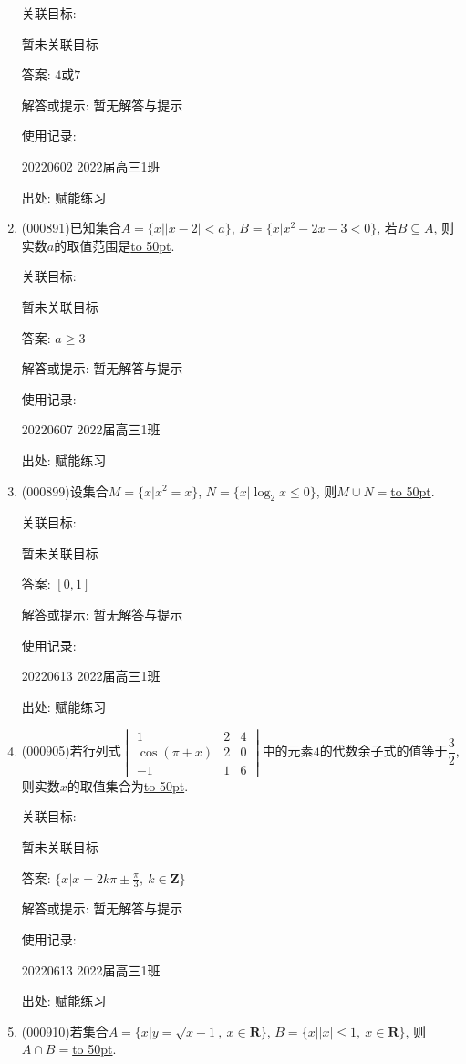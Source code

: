 \documentclass[10pt,a4paper]{article}
\newcommand{\blank}[1]{\underline{\hbox to #1pt{}}}
\begin{document}
\begin{enumerate}[1.]
关联目标:

暂未关联目标

答案: $4$或$7$

解答或提示: 暂无解答与提示

使用记录:

20220602	2022届高三1班	


出处: 赋能练习
\item { (000891)}已知集合$A=\{x||x-2|<a\}$, $B=\{x|x^2-2x-3<0\}$, 若$B\subseteq A$, 则实数$a$的取值范围是\blank{50}.


关联目标:

暂未关联目标

答案: $a\ge 3$

解答或提示: 暂无解答与提示

使用记录:

20220607	2022届高三1班	


出处: 赋能练习
\item { (000899)}设集合$M=\{x|x^2=x\}$, $N=\{x|\log_2 x\le 0\}$, 则$M\cup N=$\blank{50}.


关联目标:

暂未关联目标

答案: $[0,1]$

解答或提示: 暂无解答与提示

使用记录:

20220613	2022届高三1班	


出处: 赋能练习
\item { (000905)}若行列式$\begin{vmatrix}   1 & 2 & 4 \\   \cos (\pi +x) & 2 & 0 \\   -1 & 1 & 6 \end{vmatrix}$中的元素$4$的代数余子式的值等于$\dfrac32$, 则实数$x$的取值集合为\blank{50}.


关联目标:

暂未关联目标

答案: $\{x|x=2k\pi\pm\frac{\pi}3, \ k\in \mathbf{Z}\}$

解答或提示: 暂无解答与提示

使用记录:

20220613	2022届高三1班	


出处: 赋能练习
\item { (000910)}若集合$A=\{x|y=\sqrt{x-1},\ x\in \mathbf{R}\}$, $B=\{x||x|\le 1,\ x\in \mathbf{R}\}$, 则$A\cap B=$\blank{50}.



\end{enumerate}
\end{document}
